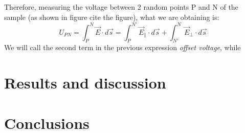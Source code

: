 \documentclass[11pt,a4paper]{article}
\begin{document}
Therefore, measuring the voltage between 2 random points P and N of the sample (as shown in figure {\tiny cite the figure}), what we are obtaining is:
\begin{equation}
U_{PN}=\int_P^N\vec{E}\cdot d\vec{s}=\int_P^{N'}\vec{E}_\parallel\cdot d\vec{s}+\int_{N'}^N\vec{E}_\perp\cdot d\vec{s}
\end{equation}
We will call the second term in the previous expression \emph{offset voltage}, while

\section{Results and discussion}


\section{Conclusions}

%
%

\begin{appendices}


\end{appendices}
\end{document}
